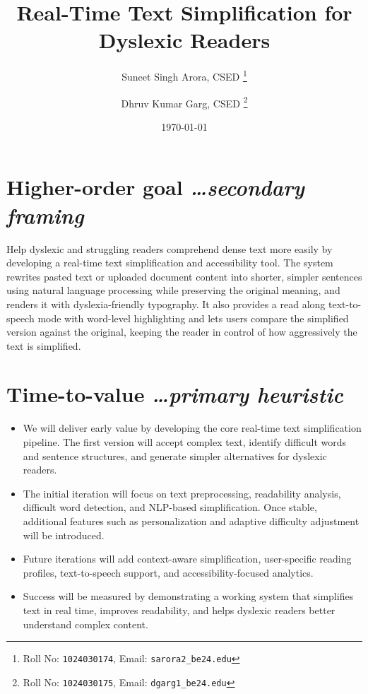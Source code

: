 \documentclass[11pt,a4paper]{article}
\title{Real-Time Text Simplification for Dyslexic Readers}
\author{
  Suneet Singh Arora, CSED%
  \thanks{Roll No: \texttt{1024030174}, %
    Email: \texttt{sarora2\_be24\@thapar.edu}}
  \and
  Dhruv Kumar Garg, CSED%
  \thanks{Roll No: \texttt{1024030175}, %
    Email: \texttt{dgarg1\_be24\@thapar.edu}}
}
\date{\today}
\newcommand{\BvrHint}[1]{%
  {\normalfont\normalsize\itshape\hfill #1}}
\begin{document}
\maketitle

\section{Higher-order goal%
\BvrHint{\ldots secondary framing}}
Help dyslexic and struggling readers comprehend dense text more easily by developing a real-time text simplification and accessibility tool. The system rewrites pasted text or uploaded document content into shorter, simpler sentences using natural language processing while preserving the original meaning, and renders it with dyslexia-friendly typography. It also provides a read along text-to-speech mode with word-level highlighting and lets users compare the simplified version against the original, keeping the reader in control of how aggressively the text is simplified.

\section{Time-to-value %
\BvrHint{\ldots primary heuristic}}

\begin{itemize}[leftmargin=0.7cm]
    \item We will deliver early value by developing the core real-time text simplification pipeline. The first version will accept complex text, identify difficult words and sentence structures, and generate simpler alternatives for dyslexic readers.
    
    \item The initial iteration will focus on text preprocessing, readability analysis, difficult word detection, and NLP-based simplification. Once stable, additional features such as personalization and adaptive difficulty adjustment will be introduced.
    
    \item Future iterations will add context-aware simplification, user-specific reading profiles, text-to-speech support, and accessibility-focused analytics.
    
    \item Success will be measured by demonstrating a working system that simplifies text in real time, improves readability, and helps dyslexic readers better understand complex content.
\end{itemize}
\end{document}
